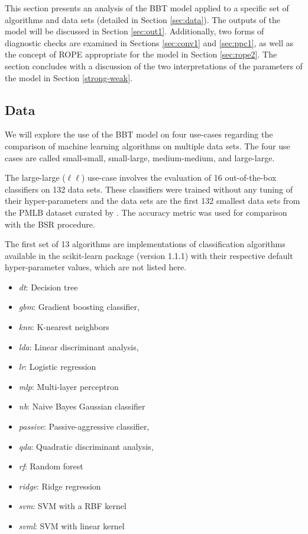 \documentclass[twoside,11pt,preprint]{article}
\def\tightlist{}
\begin{document}
This section presents an analysis of the BBT model applied to a specific set of algorithms and data sets (detailed in Section \ref{sec:data}). The outputs of the model will be discussed in Section \ref{sec:out1}. Additionally, two forms of diagnostic checks are examined in Sections \ref{sec:conv1} and \ref{sec:ppc1}, as well as the concept of ROPE appropriate for the model in Section \ref{sec:rope2}. The section concludes with a discussion of the two interpretations of the parameters of the model in Section \ref{strong-weak}.

\hypertarget{data}{%
\subsection{\texorpdfstring{Data \label{sec:data}}{Data }}\label{data}}

We will explore the use of the BBT model on four use-cases regarding
the comparison of machine learning algorithms on multiple data sets.
The four use cases are called small-small, small-large, medium-medium,
and large-large.

The large-large ($\ell\ell$) use-case involves the evaluation of 16 out-of-the-box classifiers on 132 data sets. These classifiers were trained without any tuning of their hyper-parameters and the data sets are the first 132 smallest data sets from the PMLB dataset curated by \citet{Olson2017PMLB}. The accuracy metric was used for comparison with the BSR procedure.

The first set of 13 algorithms are implementations of classification algorithms available in the scikit-learn package \citep{scikit-learn} (version 1.1.1) with their respective default hyper-parameter values, which are not listed here.

\begin{itemize}
\tightlist
\item
  \emph{dt}: Decision tree
\item
  \emph{gbm}: Gradient boosting classifier,
\item
  \emph{knn}: K-nearest neighbors
\item
  \emph{lda}: Linear discriminant analysis,
\item
  \emph{lr}: Logistic regression
\item
  \emph{mlp}: Multi-layer perceptron
\item
  \emph{nb}: Naive Bayes Gaussian classifier
\item
  \emph{passive}: Passive-aggressive classifier,
\item
  \emph{qda}: Quadratic discriminant analysis,
\item
  \emph{rf}: Random forest
\item
  \emph{ridge}: Ridge regression
\item
  \emph{svm}: SVM with a RBF kernel
\item
  \emph{svml}: SVM with linear kernel
\end{itemize}
\end{document}

